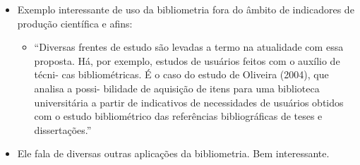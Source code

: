 \documentclass[11pt]{article}
\begin{document}
\begin{itemize}
\item Exemplo interessante de uso da bibliometria fora do âmbito de indicadores de produção científica e afins:
\begin{itemize}
\item ``Diversas frentes de estudo são levadas a termo na atualidade com essa proposta. Há, por exemplo, estudos de usuários feitos com o auxílio de técni- cas bibliométricas. É o caso do estudo de Oliveira (2004), que analisa a possi- bilidade de aquisição de itens para uma biblioteca universitária a partir de indicativos de necessidades de usuários obtidos com o estudo bibliométrico das referências bibliográficas de teses e dissertações.''
\end{itemize}
\item Ele fala de diversas outras aplicações da bibliometria. Bem interessante.
\end{itemize}
\end{document}
